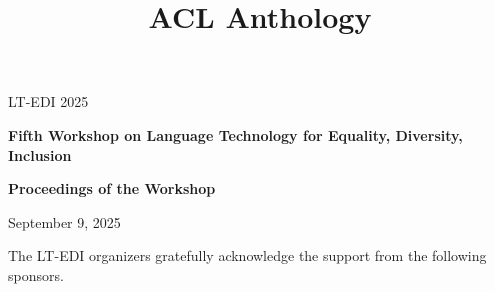 \documentclass[11pt,oneside]{book}
\date{}
\title{ACL Anthology}
\begin{document}
\begin{titlepage}
  \begin{center}
    \vspace{1.5cm}

    {\LARGE LT-EDI 2025}

    \vspace*{65mm}

    {\bf\LARGE Fifth Workshop on Language Technology for Equality, Diversity, Inclusion}

    \vspace*{5cm}

    {\bf\LARGE Proceedings of the Workshop}

    \vfill

    {\LARGE September 9, 2025}
  \end{center}
\end{titlepage}
\newpage

\setcounter{page}{2}
{}
\vspace*{2cm}
\noindent

{\Large The LT-EDI organizers gratefully acknowledge the support from the following sponsors.}
\bigskip

\vspace*{1cm}
\end{document}
